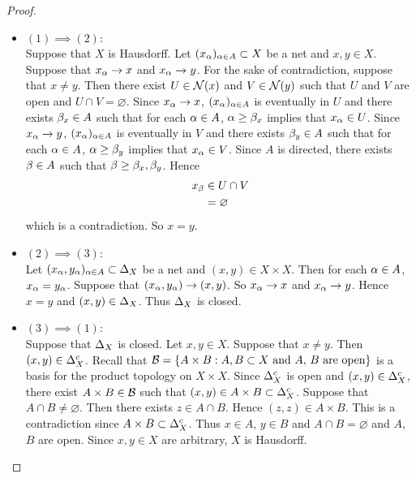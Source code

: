\documentclass{book}
\begin{document}
	\begin{proof}\
		\begin{itemize}
			\item $(1) \implies (2)$: \\
			Suppose that $X$ is Hausdorff. Let $(x_{\alpha})_{\alpha \in A} \subset X$ be a net and $x,y \in X$. Suppose that $x_{\alpha} \rightarrow x$ and $x_{\alpha} \rightarrow y$. For the sake of contradiction, suppose that $x \neq y$. Then there exist $U \in \mathcal{N}(x)$ and $V \in \mathcal{N}(y)$ such that $U$ and $V$ are open and $U \cap V = \varnothing$. Since $x_{\alpha} \rightarrow x$, $(x_{\alpha})_{\alpha \in A}$ is eventually in $U$ and there exists $\beta_x \in A$ such that for each $\alpha \in A$, $\alpha \geq \beta_x$ implies that $x_{\alpha} \in U$. Since $x_{\alpha} \rightarrow y$, $(x_{\alpha})_{\alpha \in A}$ is eventually in $V$ and there exists $\beta_y \in A$ such that for each $\alpha \in A$, $\alpha \geq \beta_y$ implies that $x_{\alpha} \in V$. Since $A$ is directed, there exists $\beta \in A$ such that $\beta \geq \beta_x, \beta_y$. Hence 
			\begin{align*}
				x_{\beta} 
				& \in U \cap V \\
				& = \varnothing
			\end{align*}
			which is a contradiction. So $x = y$.
			\item $(2) \implies (3)$: \\
			Let $(x_{\alpha}, y_{\alpha})_{\alpha \in A} \subset \Delta_X$ be a net and $(x,y) \in X \times X$. Then for each $\alpha \in A$, $x_{\alpha} = y_{\alpha}$. Suppose that $(x_{\alpha}, y_{\alpha}) \rightarrow (x,y)$. So $x_{\alpha} \rightarrow x$ and $x_{\alpha} \rightarrow y$. Hence $x = y$ and $(x,y) \in \Delta_X$. Thus $\Delta_X$ is closed.
			\item $(3) \implies (1)$: \\
			Suppose that $\Delta_X$ is closed. Let $x,y \in X$. Suppose that $x \neq y$. Then $(x,y) \in \Delta_X^c$. Recall that $\mathcal{B} = \{A \times B: A,B \subset X \text{ and $A$, $B$ are open}\}$ is a basis for the product topology on $X \times X$. Since $\Delta_X^c$ is open and $(x,y) \in \Delta_X^c$, there exist $A \times B \in \mathcal{B}$ such that $(x,y) \in A \times B \subset \Delta_X^c$. Suppose that $A \cap B \neq \varnothing$. Then there exists $z \in A \cap B$. Hence $(z,z) \in A \times B$. This is a contradiction since $A  \times B \subset \Delta_X^c$. Thus $x \in A$, $y \in B$ and $A \cap B = \varnothing$ and $A$, $B$ are open. Since $x,y \in X$ are arbitrary, $X$ is Hausdorff. 
		\end{itemize}
	\end{proof}
\end{document}
